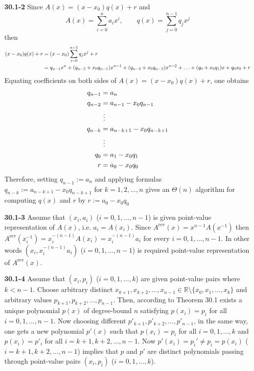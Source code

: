 \documentclass[12pt]{amsart}
\numberwithin{equation}{section}
\renewcommand{\(}{\left(}
\renewcommand{\)}{\right)}
\renewcommand{\[}{\left[}
\renewcommand{\]}{\right]}
\begin{document}
\pagestyle{empty}

\noindent \textbf{30.1-2} Since $A(x) = (x-x_0) q(x) +r$ and
$$
A(x) = \sum_{i=0}^n a_i x^i, \qquad q(x) = \sum_{j=0}^{n-1} q_jx^j
$$
then
$$
\aligned
(x-x_0) q(x) +r &= (x-x_0) \sum_{i=0}^{n-1} q_jx^j + r\\
&= q_{n-1}x^n + (q_{n-2} + x_0 q_{n-1})x^{n-1} + (q_{n-3} + x_0 q_{n-2})x^{n-2} + \ldots + (q_0 + x_0 q_1)x + q_0x_0 + r
\endaligned
$$
Equating coefficients on both sides of $A(x) = (x-x_0) q(x) +r$, one obtains
$$
\aligned
q_{n-1} &= a_n\\
q_{n-2} &= a_{n-1} - x_0 q_{n-1}\\
&\ \vdots\\
q_{n-k} &= a_{n-k+1} - x_0 q_{n-k+1}\\
&\ \vdots\\
q_0 &= a_1 - x_0 q_1\\
r &= a_0 - x_0 q_0
\endaligned
$$
Therefore, setting $q_{n-1} := a_n$ and applying formulas $q_{n-k} := a_{n-k+1} - x_0 q_{n-k+1}$ for $k=1, 2, \ldots, n$ gives an $\Theta(n)$ algorithm for computing $q(x)$ and $r$ by $r := a_0 - x_0 q_0$

\bigskip

\noindent \textbf{30.1-3} Assume that $(x_i, a_i)$ ($i=0,1,\ldots,n-1$) is given point-value representation of $A(x)$, i.e. $a_i=A(x_i)$. Since $A^{\textrm{rev}}(x) = x^{n-1} A(x^{-1})$ then $A^{\textrm{rev}}(x_i^{-1}) = x_i^{-(n-1)} A(x_i) = x_i^{-(n-1)} a_i$ for every $i=0,1,\ldots,n-1$. In other words $(x_i, x_i^{-(n-1)}a_i)$  ($i=0,1,\ldots,n-1$) is required point-value representation of $A^{\textrm{rev}}(x)$.

\bigskip

\noindent \textbf{30.1-4} Assume that $(x_i, p_i)$ ($i=0,1,\ldots,k$) are given point-value pairs where $k<n-1$. Choose arbitrary distinct $x_{k+1}, x_{k+2}, \ldots, x_{n-1} \in \mathbb{R} \setminus \{ x_0,x_1,\ldots,x_k \}$ and arbitrary values $p_{k+1}, p_{k+2},\ldots,p_{n-1}$. Then, according to Theorem 30.1 exists a unique polynomial $p(x)$ of degree-bound $n$ satisfying $p(x_i)=p_i$ for all $i=0,1,\ldots,n-1$. Now choosing different $p'_{k+1}, p'_{k+2},\ldots,p'_{n-1}$, in the same way, one gets a new polynomial $p'(x)$ such that $p(x_i)=p_i$ for all $i=0,1,\ldots,k$ and $p(x_i)=p'_i$ for all $i=k+1,k+2,\ldots,n-1$. Now $p'(x_i)=p_i' \neq p_i=p(x_i)$ ($i=k+1,k+2,\ldots,n-1$) implies that $p$ and $p'$ are distinct polynomials passing through point-value pairs $(x_i, p_i)$ ($i=0,1,\ldots,k$).

\bigskip
\end{document}
